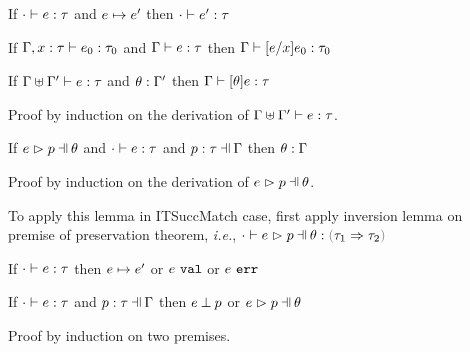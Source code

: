 \begin{theorem}[Preservation]
  \label{thrm:preservation}
  If $\cdot \vdash e : \tau$ and $e \mapsto e'$
  then $\cdot \vdash e' : \tau$
\end{theorem}

\begin{lemma}[Substitution]
  \label{lemma:substitution}
  If $\Gamma, x : \tau \vdash e_0 : \tau_0$ and $\Gamma \vdash e : \tau$
  then $\Gamma \vdash [e/x]e_0 : \tau_0$
\end{lemma}

\begin{lemma}
  \label{lemma:simult-substitution}
  If $\Gamma \uplus \Gamma' \vdash e : \tau$ and $\theta : \Gamma'$
  then $\Gamma \vdash [\theta]e : \tau$
\end{lemma}
Proof by induction on the derivation of $\Gamma \uplus \Gamma' \vdash e : \tau$.

\begin{lemma}
  \label{lemma:subs-typing}
  If $\hpatmatch{e}{p}{\theta}$ and $\cdot \vdash e : \tau$ and $\hpattyp{p}{\tau}{\Gamma}$
  then $\theta : \Gamma$
\end{lemma}
Proof by induction on the derivation of $\hpatmatch{e}{p}{\theta}$.

To apply this lemma in ITSuccMatch case, first apply inversion lemma on premise of preservation theorem,
\emph{i.e.}, $\hexptyp{\cdot}{\hpatmatch{e}{p}{\theta}}{\trul{\tau_1}{\tau_2}}$

\begin{theorem}[Progress]
  \label{thrm:progrs}
  If $\cdot \vdash e : \tau$
  then $e \mapsto e'$ or $e ~\mathtt{val}$ or $e ~\mathtt{err}$
\end{theorem}

\begin{lemma}
  \label{lemma:match-progress}
  If $\cdot \vdash e : \tau$ and $\hpattyp{p}{\tau}{\Gamma}$
  then $e \mathbin{\bot} p$ or $\hpatmatch{e}{p}{\theta}$
\end{lemma}
Proof by induction on two premises.